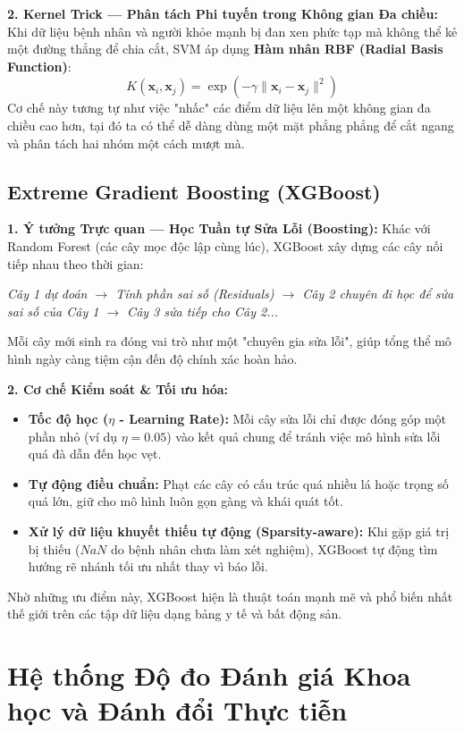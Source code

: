 \documentclass[12pt,a4paper]{report}
\begin{document}
\textbf{2. Kernel Trick — Phân tách Phi tuyến trong Không gian Đa chiều:}
Khi dữ liệu bệnh nhân và người khỏe mạnh bị đan xen phức tạp mà không thể kẻ một đường thẳng để chia cắt, SVM áp dụng \textbf{Hàm nhân RBF (Radial Basis Function)}:
\begin{equation}
K(\mathbf{x}_i, \mathbf{x}_j) = \exp\left(-\gamma \|\mathbf{x}_i - \mathbf{x}_j\|^2\right)
\end{equation}
Cơ chế này tương tự như việc "nhấc" các điểm dữ liệu lên một không gian đa chiều cao hơn, tại đó ta có thể dễ dàng dùng một mặt phẳng phẳng để cắt ngang và phân tách hai nhóm một cách mượt mà.

\subsection{Extreme Gradient Boosting (XGBoost)}
\textbf{1. Ý tưởng Trực quan — Học Tuần tự Sửa Lỗi (Boosting):}
Khác với Random Forest (các cây mọc độc lập cùng lúc), XGBoost xây dựng các cây nối tiếp nhau theo thời gian:
\begin{center}
\small
\textit{Cây 1 dự đoán $\longrightarrow$ Tính phần sai số (Residuals) $\longrightarrow$ Cây 2 chuyên đi học để sửa sai số của Cây 1 $\longrightarrow$ Cây 3 sửa tiếp cho Cây 2...}
\end{center}
Mỗi cây mới sinh ra đóng vai trò như một "chuyên gia sửa lỗi", giúp tổng thể mô hình ngày càng tiệm cận đến độ chính xác hoàn hảo.

\textbf{2. Cơ chế Kiểm soát \& Tối ưu hóa:}
\begin{itemize}[leftmargin=1.5em]
    \item \textbf{Tốc độ học ($\eta$ - Learning Rate):} Mỗi cây sửa lỗi chỉ được đóng góp một phần nhỏ (ví dụ $\eta = 0.05$) vào kết quả chung để tránh việc mô hình sửa lỗi quá đà dẫn đến học vẹt.
    \item \textbf{Tự động điều chuẩn:} Phạt các cây có cấu trúc quá nhiều lá hoặc trọng số quá lớn, giữ cho mô hình luôn gọn gàng và khái quát tốt.
    \item \textbf{Xử lý dữ liệu khuyết thiếu tự động (Sparsity-aware):} Khi gặp giá trị bị thiếu ($NaN$ do bệnh nhân chưa làm xét nghiệm), XGBoost tự động tìm hướng rẽ nhánh tối ưu nhất thay vì báo lỗi.
\end{itemize}
Nhờ những ưu điểm này, XGBoost hiện là thuật toán mạnh mẽ và phổ biến nhất thế giới trên các tập dữ liệu dạng bảng y tế và bất động sản.

\section{Hệ thống Độ đo Đánh giá Khoa học và Đánh đổi Thực tiễn}
\end{document}
